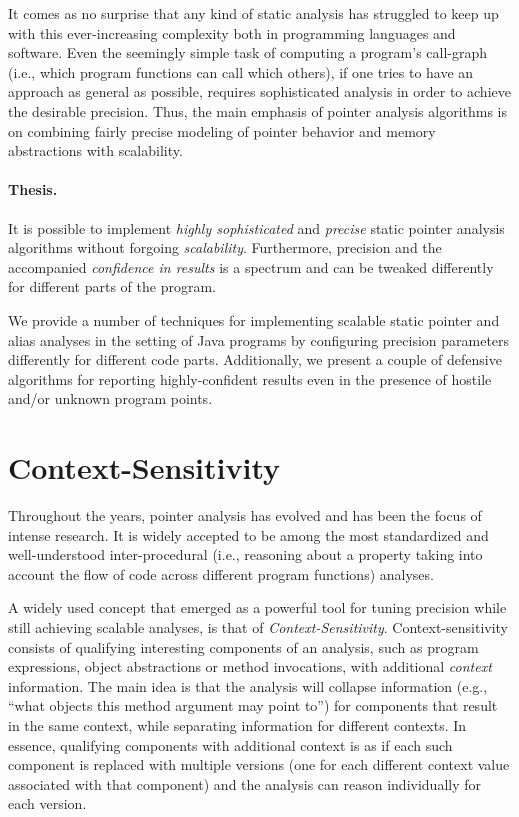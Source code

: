 It comes as no surprise that any kind of static analysis has struggled to keep up with this ever-increasing complexity both in programming languages and software. Even the seemingly simple task of computing a program's call-graph (i.e., which program functions can call which others), if one tries to have an approach as general as possible, requires sophisticated analysis in order to achieve the desirable precision. Thus, the main emphasis of pointer analysis algorithms is on combining fairly precise modeling of pointer behavior and memory abstractions with scalability.

\paragraph*{Thesis.}
\begin{displayquote}
It is possible to implement \emph{highly sophisticated} and \emph{precise} static pointer analysis algorithms without forgoing \emph{scalability}. Furthermore, precision and the accompanied \emph{confidence in results} is a spectrum and can be tweaked differently for different parts of the program.
\end{displayquote}

We provide a number of techniques for implementing scalable static pointer and alias analyses in the setting of Java programs by configuring precision parameters differently for different code parts. Additionally, we present a couple of defensive algorithms for reporting highly-confident results even in the presence of hostile and/or unknown program points.


\section{Context-Sensitivity}

Throughout the years, pointer analysis has evolved and has been the focus of intense research. It is widely accepted to be among the most standardized and well-understood inter-procedural (i.e., reasoning about a property taking into account the flow of code across different program functions) analyses.

A widely used concept that emerged as a powerful tool for tuning precision while still achieving scalable analyses, is that of \emph{Context-Sensitivity}. Context-sensitivity consists of qualifying interesting components of an analysis, such as program expressions, object abstractions or method invocations, with additional \emph{context} information. The main idea is that the analysis will collapse information (e.g., ``what objects this method argument may point to'') for components that result in the same context, while separating information for different contexts. In essence, qualifying components with additional context is as if each such component is replaced with multiple versions (one for each different context value associated with that component) and the analysis can reason individually for each version.

